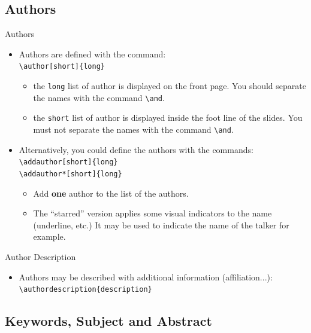 \documentclass[english,sectioncirclenumberstyle]{ciadbeamer}
\begin{document}
\subsection{Authors}

\begin{frame}{Authors}
	\begin{itemize}
	\item Authors are defined with the command: \\
		\texttt{{\textbackslash}author[short]\{long\}}
		\begin{itemize}
		\item the \texttt{long} list of author is displayed on the front page. You should separate the names with the command \texttt{{\textbackslash}and}.
		\item the \texttt{short} list of author is displayed inside the foot line of the slides. You \alert{must not separate} the names with the command \texttt{{\textbackslash}and}.
		\end{itemize}
	\vfill
	\item \alert{Alternatively}, you could define the authors with the commands: \\
		\texttt{{\textbackslash}addauthor[short]\{long\}} \\
		\texttt{{\textbackslash}addauthor*[short]\{long\}}
		\begin{itemize}
		\item Add \textbf{one} author to the list of the authors.
		\item The ``starred'' version applies some visual indicators to the name (underline, etc.) It may be used to indicate the name of the talker for example.
		\end{itemize}
	\end{itemize}
	\vfill
\end{frame}

\begin{frame}{Author Description}
	\begin{itemize}
	\item Authors may be described with additional information (affiliation...): \\
		\texttt{{\textbackslash}authordescription\{description\}}
	\end{itemize}
	\vfill
\end{frame}

\subsection{Keywords, Subject and Abstract}
\end{document}
